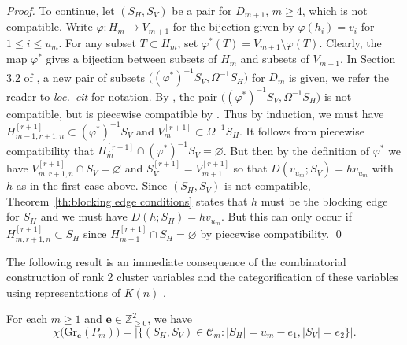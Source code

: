\documentclass[smallextended,envcountsect,envcountsame]{svjour3}
\numberwithin{equation}{section}
\newcommand{\ZZ}{\mathbb{Z}}
\newcommand{\bfe}{\mathbf{e}}
\newcommand{\cC}{\mathcal{C}}
\newcommand{\Gr}{\mathrm{Gr}}
\begin{document}
\begin{proof}
  To continue, let $(S_H,S_V)$ be a pair for $D_{m+1}$, $m\ge4$, which is not compatible.
  Write $\varphi:H_m\to V_{m+1}$ for the bijection given by $\varphi(h_i)=v_i$ for $1\le i\le u_m$.
  For any subset $T\subset H_m$, set $\varphi^*(T)=V_{m+1}\setminus\varphi(T)$.
  Clearly, the map $\varphi^*$ gives a bijection between subsets of $H_m$ and subsets of $V_{m+1}$.
  In Section 3.2 of \cite{rupel}, a new pair of subsets $\big((\varphi^*)^{-1}S_V,\Omega^{-1}S_H\big)$ for $D_m$ is given, we refer the reader to \emph{loc.\ cit} for notation.
  By \cite[Proposition 3.10]{rupel}, the pair $\big((\varphi^*)^{-1}S_V,\Omega^{-1}S_H\big)$ is not compatible, but is piecewise compatible by \cite[Proposition 3.16]{rupel}.
  Thus by induction, we must have $H_{m-1,r+1,n}^{[r+1]}\subset(\varphi^*)^{-1}S_V$ and $V_m^{[r+1]}\subset\Omega^{-1}S_H$.
  It follows from piecewise compatibility that $H_m^{[r+1]}\cap(\varphi^*)^{-1}S_V=\varnothing$.
  But then by the definition of $\varphi^*$ we have $V_{m,r+1,n}^{[r+1]}\cap S_V=\varnothing$ and $S_V^{[r+1]}=V_{m+1}^{[r+1]}$ so that $D(v_{u_m};S_V)=hv_{u_m}$ with $h$ as in the first case above.
  Since $(S_H,S_V)$ is not compatible, Theorem~\ref{th:blocking edge conditions} states that $h$ must be the blocking edge for $S_H$ and we must have $D(h;S_H)=hv_{u_m}$.
  But this can only occur if $H_{m,r+1,n}^{[r+1]}\subset S_H$ since $H_{m+1}^{[r+1]}\cap S_H=\varnothing$ by piecewise compatibility.
\qed\end{proof}

The following result is an immediate consequence of the combinatorial construction of rank 2 cluster variables \cite{llz} and the categorification of these variables using representations of $K(n)$ \cite{cc,ck}.
\begin{theorem}
  \label{th:combinatorial euler}
  \cite{llz}
  For each $m\ge1$ and $\bfe\in\ZZ_{\ge0}^2$, we have 
  \[\chi\big(\Gr_\bfe(P_m)\big)=\Big|\big\{(S_H,S_V)\in\cC_m:|S_H|=u_m-e_1,|S_V|=e_2\big\}\Big|.\]
\end{theorem}
\end{document}
